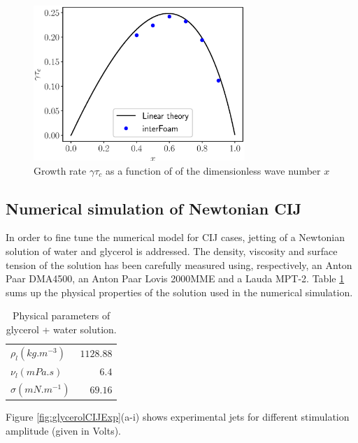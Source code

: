 \documentclass[twocolumn,10pt]{asme2ej}
\begin{document}
\begin{figure}[h]
    \centering
    \includegraphics[width=8cm]{dispersion.eps}
    \caption{Growth rate $\gamma \tau_c$ as a function of of the dimensionless wave number $x$}
    \label{fig:growthrate}
\end{figure}

\subsection{Numerical simulation of Newtonian CIJ}\label{sec:glycerol}
In order to fine tune the numerical model for CIJ cases, jetting of a Newtonian solution of water and glycerol is addressed. The density, viscosity and surface tension of the solution has been carefully measured using, respectively, an Anton Paar DMA4500, an Anton Paar Lovis 2000MME and a Lauda MPT-2. Table \ref{tab:parametersGlycerol} sums up the physical properties of the solution used in the numerical simulation.

\begin{table}
    \begin{center}
        \begin{tabular}{lr}
            \hline
            $\rho_{l} (kg.m^{-3})$ & $1128.88$\\
            $\nu_{l} (mPa.s)$ & $6.4$\\
            $\sigma (mN.m^{-1})$ & $69.16$\\
            \hline
        \end{tabular}
    \end{center}
    
    \caption{\label{tab:parametersGlycerol} Physical parameters of glycerol + water solution.}
\end{table}

Figure \ref{fig:glycerolCIJExp}(a-i) shows experimental jets for different stimulation amplitude (given in Volts). 
\end{document}
